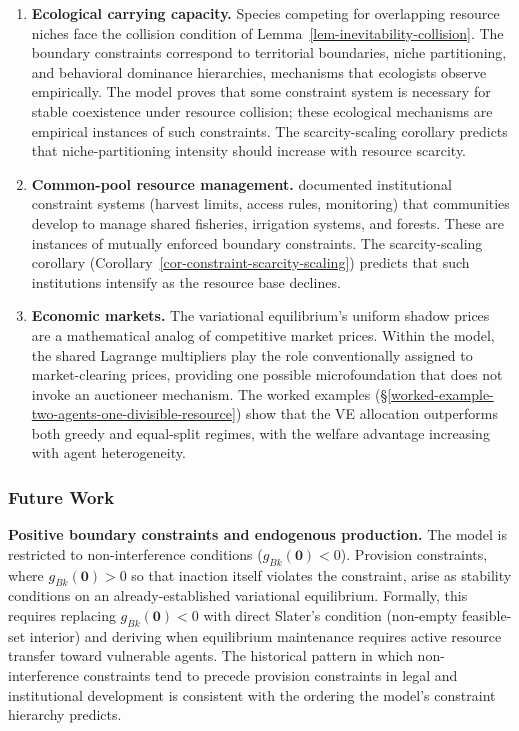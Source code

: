 \documentclass[11pt]{article}
\theoremstyle{plain}
\theoremstyle{definition}
\theoremstyle{remark}
\let\origsubsubsection\subsubsection
\renewcommand{\subsubsection}{\needspace{4\baselineskip}\origsubsubsection}
\begin{document}
\begin{enumerate}
\def\labelenumi{\arabic{enumi}.}
\item
  \textbf{Ecological carrying capacity.} Species competing for
  overlapping resource niches face the collision condition of
  Lemma~\ref{lem-inevitability-collision}. The boundary constraints
  correspond to territorial boundaries, niche partitioning, and
  behavioral dominance hierarchies, mechanisms that ecologists observe
  empirically. The model proves that some constraint system is necessary
  for stable coexistence under resource collision; these ecological
  mechanisms are empirical instances of such constraints. The
  scarcity-scaling corollary predicts that niche-partitioning intensity
  should increase with resource scarcity.
\item
  \textbf{Common-pool resource management.} \citet{Ostrom1990}
  documented institutional constraint systems (harvest limits, access
  rules, monitoring) that communities develop to manage shared
  fisheries, irrigation systems, and forests. These are instances of
  mutually enforced boundary constraints. The scarcity-scaling corollary
  (Corollary~\ref{cor-constraint-scarcity-scaling}) predicts that such
  institutions intensify as the resource base declines.
\item
  \textbf{Economic markets.} The variational equilibrium's uniform
  shadow prices are a mathematical analog of competitive market prices.
  Within the model, the shared Lagrange multipliers play the role
  conventionally assigned to market-clearing prices, providing one
  possible microfoundation that does not invoke an auctioneer mechanism.
  The worked examples
  (§\ref{worked-example-two-agents-one-divisible-resource}) show that
  the VE allocation outperforms both greedy and equal-split regimes,
  with the welfare advantage increasing with agent heterogeneity.
\end{enumerate}

\subsubsection{Future Work}\label{future-work}

\textbf{Positive boundary constraints and endogenous production.} The
model is restricted to non-interference conditions
(\(g_{Bk}(\mathbf{0}) < 0\)). Provision constraints, where
\(g_{Bk}(\mathbf{0}) > 0\) so that inaction itself violates the
constraint, arise as stability conditions on an already-established
variational equilibrium. Formally, this requires replacing
\(g_{Bk}(\mathbf{0}) < 0\) with direct Slater's condition (non-empty
feasible-set interior) and deriving when equilibrium maintenance
requires active resource transfer toward vulnerable agents. The
historical pattern in which non-interference constraints tend to precede
provision constraints in legal and institutional development is
consistent with the ordering the model's constraint hierarchy predicts.
\end{document}
